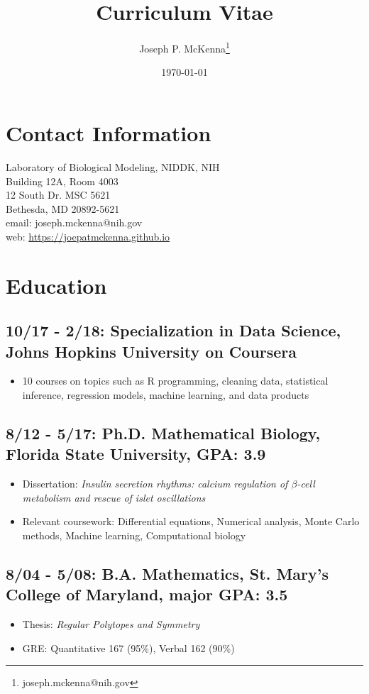 \documentclass[11pt]{cv}
\author{Joseph P. McKenna\thanks{joseph.mckenna@nih.gov}}
\date{\today}
\title{Curriculum Vitae}
\begin{document}
\maketitle

\section*{Contact Information}
\label{sec:orga781e8d}
Laboratory of Biological Modeling, NIDDK, NIH\\
Building 12A, Room 4003\\
12 South Dr. MSC 5621\\
Bethesda, MD 20892-5621\\
email: joseph.mckenna@nih.gov\\
web: \url{https://joepatmckenna.github.io}\\
\section*{Education}
\label{sec:orga02a735}
\subsection*{10/17 - 2/18: Specialization in Data Science, Johns Hopkins University on Coursera}
\label{sec:org5e931a5}
\begin{itemize}
\item 10 courses on topics such as R programming, cleaning data, statistical inference, regression models, machine learning, and data products\\
\end{itemize}
\subsection*{8/12 - 5/17: Ph.D. Mathematical Biology, Florida State University, GPA: 3.9}
\label{sec:org373e84b}
\begin{itemize}
\item Dissertation: \emph{Insulin secretion rhythms: calcium regulation of \(\beta\)-cell metabolism and rescue of islet oscillations}\\
\item Relevant coursework: Differential equations, Numerical analysis, Monte Carlo methods, Machine learning, Computational biology\\
\end{itemize}
\subsection*{8/04 - 5/08: B.A. Mathematics, St. Mary's College of Maryland, major GPA: 3.5}
\label{sec:org781d516}
\begin{itemize}
\item Thesis: \emph{Regular Polytopes and Symmetry}\\
\item GRE: Quantitative 167 (95\%), Verbal 162 (90\%)\\
\end{itemize}
\end{document}
